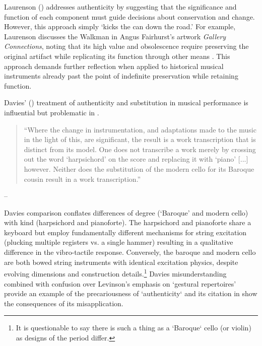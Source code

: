 Laurenson (\citeyear{laurenson_authenticity_2006}) addresses authenticity by suggesting that the significance and function of each component must guide decisions about conservation and change. However, this approach simply  `kicks the can down the road.’ For example, Laurenson discusses the Walkman in Angus Fairhurst’s artwork \textit{Gallery Connections}, noting that its high value and obsolescence require preserving the original artifact while replicating its function through other means \cite{laurenson_management_2005}. This approach demands further reflection when applied to historical musical instruments already past the point of indefinite preservation while retaining function.

Davies' (\citeyear{davies_authenticity_2001}) treatment of authenticity and substitution in musical performance is influential but problematic in \cite{laurenson_authenticity_2006}. 

\begin{quotation}
    ``Where the change in instrumentation, and adaptations made to the music in the light of this, are significant, the result is a work transcription that is distinct from its model. One does not transcribe a work merely by crossing out the word ‘harpsichord’ on the score and replacing it with ‘piano’ [...] however. Neither does the substitution of the modern cello for its Baroque cousin result in a work transcription.''
\end{quotation}
\begin{flushright}
-- \cite[p. 222]{davies_authenticity_2001}
\end{flushright}

Davies comparison conflates differences of degree (`Baroque' and modern cello) with kind (harpsichord and pianoforte). The harpsichord and pianoforte share a keyboard but employ fundamentally different mechanisms for string excitation (plucking multiple registers vs. a single hammer) resulting in a qualitative difference in the vibro-tactile response. Conversely, the baroque and modern cello are both bowed string instruments with identical excitation physics, despite evolving dimensions and construction details.\footnote{It is questionable to say there is such a thing as a `Baroque` cello (or violin) as designs of the period differ.} Davies misunderstanding combined with confusion over Levinson's emphasis on `gestural repertoires' \cite{levinson_music_1990} provide an example of the precariousness of `authenticity` and its citation in \cite{laurenson_authenticity_2006} show the consequences of its misapplication.

